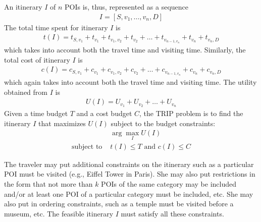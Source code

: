 An itinerary $I$ of $n$ POIs is, thus, represented as a sequence
%
\begin{align}
	I = [ S, v_1, \dots, v_n, D ]
\end{align}
%
The total time spent for itinerary $I$ is
%
\begin{align}
	t(I) = t_{S,v_1} + t_{v_1} + t_{v_1,v_2} + t_{v_2} + \dots + t_{v_{n-1,v_n}} + t_{v_n} + t_{v_n,D}
\end{align}
%
which takes into account both the travel time and visiting time.  Similarly,
the total cost of itinerary $I$ is 
%
\begin{align}
	c(I) = c_{S,v_1} + c_{v_1} + c_{v_1,v_2} + c_{v_2} + \dots + c_{v_{n-1,v_n}} + c_{v_n} + c_{v_n,D}
\end{align}
%
which again takes into account both the travel time and visiting time.  The
utility obtained from $I$ is
%
\begin{align}
	U(I) = U_{v_1} + U_{v_2} + \dots + U_{v_n}
\end{align}
%
Given a time budget $T$ and a cost budget $C$, the TRIP problem is to find the
itinerary $I$ that maximizes $U(I)$ subject to the budget constraints:
%
\begin{align}
	& \arg\max_I U(I) \\
	\text{subject to } & t(I) \leq T \text{ and } c(I) \leq C
\end{align}

The traveler may put additional constraints on the itinerary such as
a particular POI must be visited (e.g., Eiffel Tower in Paris).  She
may also put restrictions in the form that not more than $k$ POIs of
the same category may be included and/or at least one POI of a particular
category must be included, etc.  She may also put in ordering
constraints, such as a temple must be visited before a museum, etc.  The feasible itinerary $I$ must satisfy all these
constraints.

